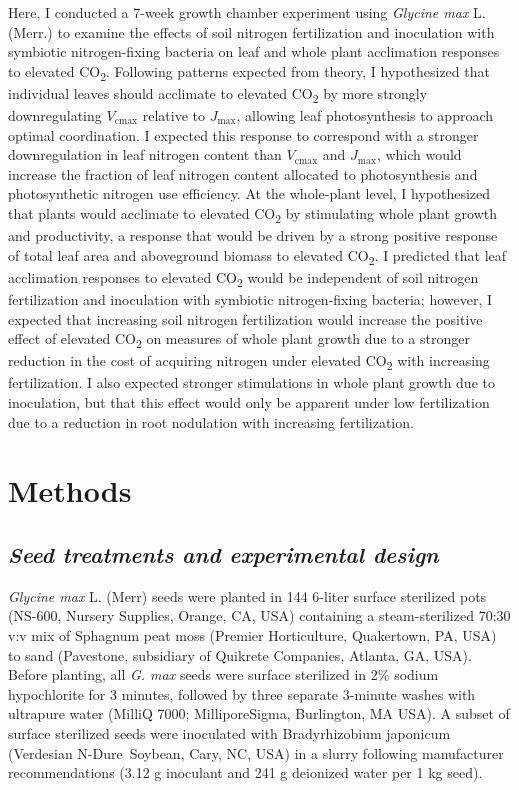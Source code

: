 Here, I conducted a 7-week growth chamber experiment using \textit{Glycine max} L. (Merr.) to examine the effects of soil nitrogen fertilization and inoculation with symbiotic nitrogen-fixing bacteria on leaf and whole plant acclimation responses to elevated CO\textsubscript{2}. Following patterns expected from theory, I hypothesized that individual leaves should acclimate to elevated CO\textsubscript{2} by more strongly downregulating $V_\mathrm{cmax}$ relative to $J_\mathrm{max}$, allowing leaf photosynthesis to approach optimal coordination. I expected this response to correspond with a stronger downregulation in leaf nitrogen content than $V_\mathrm{cmax}$ and $J_\mathrm{max}$, which would increase the fraction of leaf nitrogen content allocated to photosynthesis and photosynthetic nitrogen use efficiency. At the whole-plant level, I hypothesized that plants would acclimate to elevated CO\textsubscript{2} by stimulating whole plant growth and productivity, a response that would be driven by a strong positive response of total leaf area and aboveground biomass to elevated CO\textsubscript{2}. I predicted that leaf acclimation responses to elevated CO\textsubscript{2} would be independent of soil nitrogen fertilization and inoculation with symbiotic nitrogen-fixing bacteria; however, I expected that increasing soil nitrogen fertilization would increase the positive effect of elevated CO\textsubscript{2} on measures of whole plant growth due to a stronger reduction in the cost of acquiring nitrogen under elevated CO\textsubscript{2} with increasing fertilization. I also expected stronger stimulations in whole plant growth due to inoculation, but that this effect would only be apparent under low fertilization due to a reduction in root nodulation with increasing fertilization.

\section{Methods}
\subsection{\textit{Seed treatments and experimental design}}
\textit{Glycine max} L. (Merr) seeds were planted in 144 6-liter surface sterilized pots (NS-600, Nursery Supplies, Orange, CA, USA) containing a steam-sterilized 70:30 v:v mix of Sphagnum peat moss (Premier Horticulture, Quakertown, PA, USA) to sand (Pavestone, subsidiary of Quikrete Companies, Atlanta, GA, USA). Before planting, all \textit{G. max} seeds were surface sterilized in 2\% sodium hypochlorite for 3 minutes, followed by three separate 3-minute washes with ultrapure water (MilliQ 7000; MilliporeSigma, Burlington, MA USA). A subset of surface sterilized seeds were inoculated with Bradyrhizobium japonicum (Verdesian N-Dure\texttrademark\ Soybean, Cary, NC, USA) in a slurry following manufacturer recommendations (3.12 g inoculant and 241 g deionized water per 1 kg seed).
    
